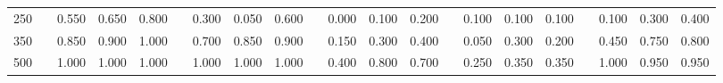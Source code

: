 % 
\begin{tabular}{ccccccccccccccccccccc}
  \hline
  \hline
250 &  & 0.550 & 0.650 & 0.800 &  & 0.300 & 0.050 & 0.600 &  & 0.000 & 0.100 & 0.200 &  & 0.100 & 0.100 & 0.100 &  & 0.100 & 0.300 & 0.400 \\ 
  350 &  & 0.850 & 0.900 & 1.000 &  & 0.700 & 0.850 & 0.900 &  & 0.150 & 0.300 & 0.400 &  & 0.050 & 0.300 & 0.200 &  & 0.450 & 0.750 & 0.800 \\ 
  500 &  & 1.000 & 1.000 & 1.000 &  & 1.000 & 1.000 & 1.000 &  & 0.400 & 0.800 & 0.700 &  & 0.250 & 0.350 & 0.350 &  & 1.000 & 0.950 & 0.950 \\ 
   \hline
\end{tabular}
